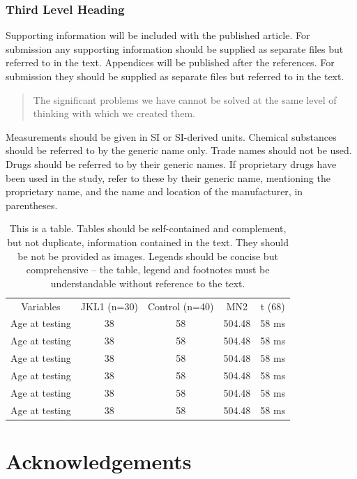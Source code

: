 \documentclass[alpha-refs]{wiley-article}
\begin{document}
\par\null

\subsubsection{Third Level Heading}

Supporting information will be included with the published article. For
submission any supporting information should be supplied as separate
files but referred to in the text. Appendices will be published after
the references. For submission they should be supplied as separate files
but referred to in the text.

\par\null

\begin{quote}
The significant problems we have cannot be solved at the same level of
thinking with which we created them.
\end{quote}

Measurements should be given in SI or SI-derived units. Chemical
substances should be referred to by the generic name only. Trade names
should not be used. Drugs should be referred to by their generic names.
If proprietary drugs have been used in the study, refer to these by
their generic name, mentioning the proprietary name, and the name and
location of the manufacturer, in parentheses.
\begin{table}[h!]
\centering
\normalsize\begin{tabulary}{1.0\textwidth}{CCCCC}
Variables & JKL1 (n=30) & Control (n=40) & MN2 & t (68) \\
Age at testing & 38 & 58 & 504.48 & 58 ms \\
Age at testing & 38 & 58 & 504.48 & 58 ms \\
Age at testing & 38 & 58 & 504.48 & 58 ms \\
Age at testing & 38 & 58 & 504.48 & 58 ms \\
Age at testing & 38 & 58 & 504.48 & 58 ms \\
Age at testing & 38 & 58 & 504.48 & 58 ms \\
\end{tabulary}
\caption{{This is a table. Tables should be self-contained and complement, but not
duplicate, information contained in the text. They should be not be
provided as images. Legends should be concise but comprehensive -- the
table, legend and footnotes must be understandable without reference to
the text.
{\label{536540}}%
}}
\end{table}\section{Acknowledgements}\label{acknowledgements}
\end{document}
